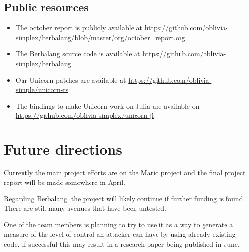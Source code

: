 \documentclass{article}
\begin{document}
\subsection{Public resources}
\begin{itemize}
    \item The october report is publicly available at \url{https://github.com/oblivia-simplex/berbalang/blob/master/org/october_report.org}
    \item The Berbalang source code is available at \url{https://github.com/oblivia-simplex/berbalang}
    \item Our Unicorn patches are available at \url{https://github.com/oblivia-simple/unicorn-rs}
    \item The bindings to make Unicorn work on Julia are available on \url{https://github.com/oblivia-simplex/unicorn-jl}
\end{itemize}

\section{Future directions}
Currently the main project efforts are on the Mario project and the final project report will be made somewhere in April.

Regarding Berbalang, the project will likely continue if further funding is found. There are still many avenues that have been untested.

One of the team members is planning to try to use it as a way to generate a measure of the level of control an attacker can have by using already existing code. If successful this may result in a research paper being published in June.
\end{document}

